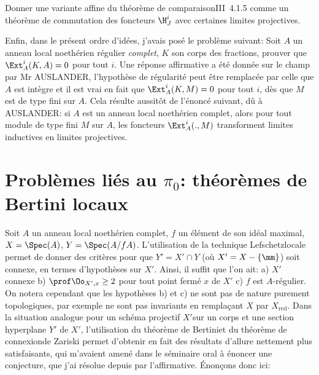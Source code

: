 \begin{probleme} \label{XIII.1.4}
Donner une variante affine du \og th\'eor\`eme de comparaison\fg \textup{\EGA III~4.1.5} comme un th\'eor\`eme de commutation des foncteurs $\H^i_J$ avec certaines limites projectives.
\end{probleme}

Enfin, dans le pr\'esent ordre d'id\'ees, j'avais pos\'e le probl\`eme suivant: Soit $A$ un anneau local noeth\'erien r\'egulier \emph{complet}, $K$ son corps des fractions, prouver que $\Ext^i_A(K, A)=0$ pour tout $i$. Une r\'eponse affirmative a \'et\'e donn\'ee sur le champ par Mr AUSLANDER, l'hypoth\`ese de r\'egularit\'e peut \^etre remplac\'ee par celle que $A$ est int\`egre et il est vrai en fait que $\Ext^i_A(K, M)=0$ pour tout $i$, d\`es que $M$ est de type fini sur $A$. Cela r\'esulte aussit\^{o}t de l'\'enonc\'e suivant, d\^u \`a AUSLANDER: si $A$ est un anneau local noeth\'erien complet, alors pour tout module de type fini $M$ sur $A$, les foncteurs $\Ext_A^i(., M)$ transforment limites inductives en limites projectives.

\section{Probl\`emes li\'es au $\pi_0$: th\'eor\`emes de Bertini locaux} \label{XIII.2}

Soit $A$ un anneau local noeth\'erien complet, $f$ un \'el\'ement de son
id\'eal maximal, $X=\Spec (A)$, $Y=\Spec(A/fA)$. L'utilisation de la
technique \og Lefschetz\fg locale permet de donner des crit\`eres
pour que $Y'=X'\cap Y$ (o\`u $X'=X-\{\mm\}$) soit connexe, en termes
d'hypoth\`eses sur $X'$. Ainsi, il suffit que l'on ait: a) $X'$
connexe b) $\prof \Oo_{X', x} \ge 2$ pour tout point ferm\'e $x$
de $X'$ c) $f$ est $A$-r\'egulier. On notera cependant que les
hypoth\`eses b) et c) ne sont pas de nature purement
topologiques, par exemple ne sont pas invariants en
rempla\c cant $X$ par $X_{\text{red}}$. Dans la situation analogue
pour un sch\'ema projectif $X'$sur un corps et une section
hyperplane $Y'$ de $X'$, l'utilisation du \og th\'eor\`eme de
Bertini\fg et du \og th\'eor\`eme de connexion\fg de Zariski permet
d'obtenir en fait des r\'esultats d'allure nettement plus
satisfaisants, qui m'avaient amen\'e dans le s\'eminaire oral \`a
\'enoncer une conjecture, que j'ai r\'esolue depuis par l'affirmative.
\'Enon\c cons donc ici:

